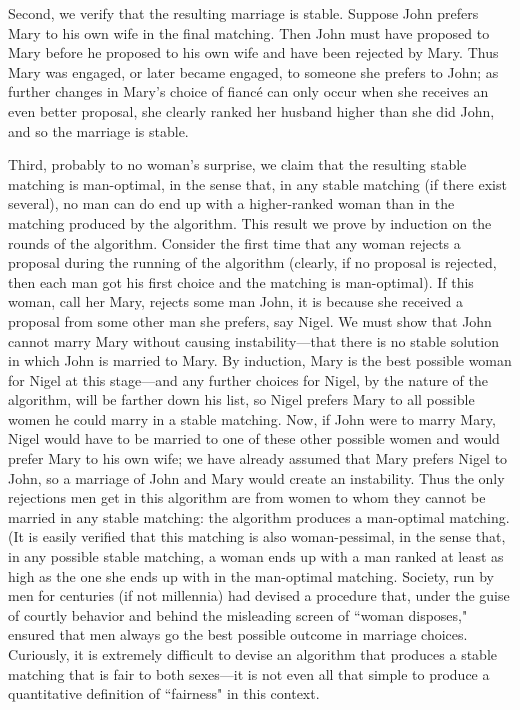 \documentclass[11pt]{article}
\begin{document}
Second, we verify that the resulting marriage is stable.  Suppose John
prefers Mary to his own wife in the final matching.  Then John must have
proposed to Mary before he proposed to his own wife and have been rejected
by Mary.  Thus Mary was engaged, or later became engaged, to someone she
prefers to John; as further changes in Mary's choice of fianc\'e can only
occur when she receives an even better proposal, she clearly ranked her husband
higher than she did John, and so the marriage is stable.

Third, probably to no woman's surprise, we claim that the resulting stable
matching is man-optimal, in the sense that, in any stable matching (if there
exist several), no man can do end up with a higher-ranked woman than in the
matching produced by the algorithm.  This result we prove by induction on
the rounds of the algorithm.  Consider the first time that any woman rejects
a proposal during the running of the algorithm (clearly, if no proposal is
rejected, then each man got his first choice and the matching is man-optimal).
If this woman, call her Mary, rejects some man John, it is because she received
a proposal from some other man she prefers, say Nigel.  We must show that
John cannot marry Mary without causing instability---that there is no stable
solution in which John is married to Mary.  By induction, Mary is the best
possible woman for Nigel at this stage---and any further choices for Nigel,
by the nature of the algorithm, will be farther down his list, so Nigel prefers
Mary to all possible women he could marry in a stable matching.  Now, if
John were to marry Mary, Nigel would have to be married to one of these other
possible women and would prefer Mary to his own wife; we have already assumed
that Mary prefers Nigel to John, so a marriage of John and Mary would create
an instability.  Thus the only rejections men get in this algorithm are from
women to whom they cannot be married in any stable matching: the algorithm
produces a man-optimal matching.  (It is easily verified that this matching
is also woman-pessimal, in the sense that, in any possible stable matching,
a woman ends up with a man ranked at least as high as the one she ends up
with in the man-optimal matching.  Society, run by men for centuries (if not
millennia) had devised a procedure that, under the guise of courtly behavior
and behind the misleading screen of ``woman disposes," ensured that men always
go the best possible outcome in marriage choices.  Curiously, it is extremely
difficult to devise an algorithm that produces a stable matching that is fair
to both sexes---it is not even all that simple to produce a quantitative
definition of ``fairness" in this context.
\end{document}
